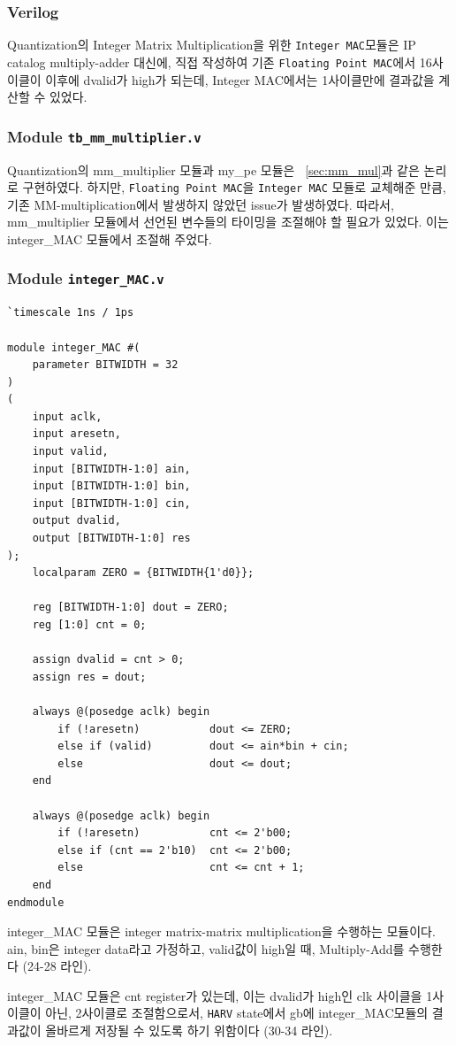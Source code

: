 \documentclass{article}
\begin{document}
\subsubsection{Verilog}
Quantization의 Integer Matrix Multiplication을 위한 \texttt{Integer MAC}모듈은 IP catalog multiply-adder\cite{Multiply_Addder} 대신에, 직접 작성하여 기존 \texttt{Floating Point MAC}에서 16사이클이 이후에 dvalid가 high가 되는데, Integer MAC에서는 1사이클만에 결과값을 계산할 수 있었다.
\subsubsection*{Module \texttt{tb\_mm\_multiplier.v}}
Quantization의 mm\_multiplier 모듈과 my\_pe 모듈은 ~\ref{sec:mm_mul}과 같은 논리로 구현하였다. 하지만, \texttt{Floating Point MAC}을 \texttt{Integer MAC} 모듈로 교체해준 만큼, 기존 MM-multiplication에서 발생하지 않았던 issue가 발생하였다. 따라서, mm\_multiplier 모듈에서 선언된 변수들의 타이밍을 조절해야 할 필요가 있었다. 이는 integer\_MAC 모듈에서 조절해 주었다.
\subsubsection*{Module \texttt{integer\_MAC.v}}
\begin{lstlisting}[style={verilog-style}]
`timescale 1ns / 1ps

module integer_MAC #(
    parameter BITWIDTH = 32
)
(
    input aclk,                                         
    input aresetn,                                      
    input valid,
    input [BITWIDTH-1:0] ain,
    input [BITWIDTH-1:0] bin,
    input [BITWIDTH-1:0] cin,
    output dvalid,              
    output [BITWIDTH-1:0] res
);
    localparam ZERO = {BITWIDTH{1'd0}};
    
    reg [BITWIDTH-1:0] dout = ZERO;
    reg [1:0] cnt = 0;
    
    assign dvalid = cnt > 0;
    assign res = dout;
    
    always @(posedge aclk) begin
        if (!aresetn)           dout <= ZERO;
        else if (valid)         dout <= ain*bin + cin;
        else                    dout <= dout;
    end
    
    always @(posedge aclk) begin
        if (!aresetn)           cnt <= 2'b00;
        else if (cnt == 2'b10)  cnt <= 2'b00;
        else                    cnt <= cnt + 1;
    end    
endmodule
\end{lstlisting}
\begin{itemize*}
    \item integer\_MAC 모듈은 integer matrix-matrix multiplication을 수행하는 모듈이다. ain, bin은 integer data라고 가정하고, valid값이 high일 때, Multiply-Add를 수행한다 (24-28 라인).
    \item integer\_MAC 모듈은 cnt register가 있는데, 이는 dvalid가 high인 clk 사이클을 1사이클이 아닌, 2사이클로 조절함으로서, \texttt{HARV} state에서 gb에 integer\_MAC모듈의 결과값이 올바르게 저장될 수 있도록 하기 위함이다 (30-34 라인).
\end{itemize*}
\end{document}
